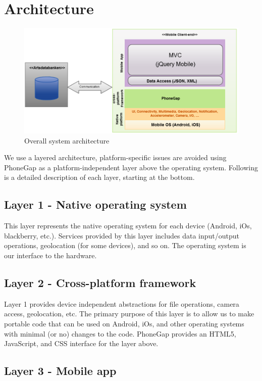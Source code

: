 \section{Architecture}
\begin{figure}[htb]
	\centering
	\includegraphics[width=1.0\textwidth]{architecture/architecture3.png}
	\caption{Overall system architecture}
	\label{fig:architecture}
\end{figure}

We use a layered architecture, platform-specific issues are avoided using
PhoneGap as a platform-independent layer above the operating system. Following
is a detailed description of each layer, starting at the bottom.

\subsection{Layer 1 - Native operating system}

This layer represents the native operating system for each device (Android, iOs,
blackberry, etc.). Services provided by this layer includes data input/output
operations, geolocation (for some devices), and so on. The operating system is
our interface to the hardware.

\subsection{Layer 2 - Cross-platform framework}

Layer 1 provides device independent abstractions for file operations, camera
access, geolocation, etc. The primary purpose of this layer is to allow us to
make portable code that can be used on Android, iOs, and other operating systems
with minimal (or no) changes to the code. PhoneGap provides an HTML5,
JavaScript, and CSS interface for the layer above.

\subsection{Layer 3 - Mobile app}

